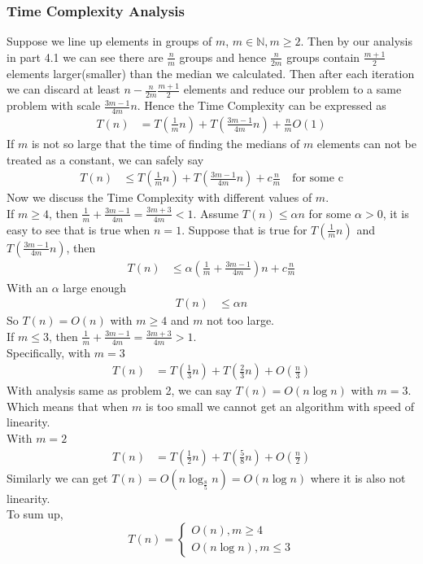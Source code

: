 \documentclass[12pt,letterpaper]{article}
\begin{document}
\subsubsection{Time Complexity Analysis}
Suppose we line up elements in groups of $m$, $m\in\mathbb{N},m\geq 2$. Then by our analysis in part 4.1 we can see there are $\frac{n}{m}$ groups and hence $\frac{n}{2m}$ groups contain $\frac{m+1}{2}$ elements larger(smaller) than the median we calculated. Then after each iteration we can discard at least $n-\frac{n}{2m}\frac{m+1}{2}$ elements and reduce our problem to a same problem with scale $\frac{3m-1}{4m}n$. Hence the Time Complexity can be expressed as 
\begin{align}
    T(n)&=T(\frac{1}{m}n)+T(\frac{3m-1}{4m}n)+\frac{n}{m}O(1)
\end{align}
If $m$ is not so large that the time of finding the medians of $m$ elements can not be treated as a constant, we can safely say 
\begin{align}
    T(n)&\leq T(\frac{1}{m}n)+T(\frac{3m-1}{4m}n)+c\frac{n}{m} \quad \text{for some c}
\end{align}
Now we discuss the Time Complexity with different values of $m$.\\
If $m\geq 4$, then $\frac{1}{m}+\frac{3m-1}{4m}=\frac{3m+3}{4m}<1$. Assume $T(n)\leq\alpha n$ for some $\alpha>0$, it is easy to see that is true when $n=1$. Suppose that is true for $T(\frac{1}{m}n)$ and $T(\frac{3m-1}{4m}n)$, then 
\begin{align}
    T(n)&\leq \alpha\left(\frac{1}{m}+\frac{3m-1}{4m}\right)n+c\frac{n}{m}
\end{align} 
With an $\alpha$ large enough
\begin{align}
    T(n)&\leq \alpha n
\end{align}
So $T(n)=O(n)$ with $m\geq 4$ and $m$ not too large. \\
If $m\leq 3$, then $\frac{1}{m}+\frac{3m-1}{4m}=\frac{3m+3}{4m}>1$. \\
Specifically, with $m=3$
\begin{align}
    T(n)&=T(\frac{1}{3}n)+T(\frac{2}{3}n)+O(\frac{n}{3})
\end{align}
With analysis same as problem 2, we can say $T(n)=O(n\log n)$ with $m=3$. Which means that when $m$ is too small we cannot get an algorithm with speed of linearity.\\
With $m=2$
\begin{align}
    T(n)&=T(\frac{1}{2}n)+T(\frac{5}{8}n)+O(\frac{n}{2})
\end{align}
Similarly we can get $T(n)=O(n\log_{\frac{8}{5}}n)=O(n\log n)$ where it is also not linearity.\\
To sum up, 
$$T(n)=\begin{cases}
    O(n), m\geq 4\\
    O(n\log n), m\leq 3
\end{cases}$$
\newpage
\end{document}
